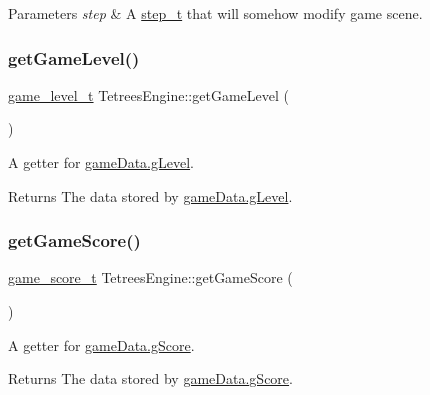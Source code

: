 \begin{DoxyParams}{Parameters}
{\em step} & A \hyperlink{TetreesDefs_8hpp_a4d5a793092a473f85b4c1f7faf62afed}{step\+\_\+t} that will somehow modify game scene. \\
\hline
\end{DoxyParams}
\mbox{\label{classTetreesEngine_a7ad503b48ba753c446e5438ca67aa4e3}} 
\subsubsection{\texorpdfstring{get\+Game\+Level()}{getGameLevel()}}
{\footnotesize\ttfamily \hyperlink{structgame__level__t}{game\+\_\+level\+\_\+t} Tetrees\+Engine\+::get\+Game\+Level (\begin{DoxyParamCaption}{ }\end{DoxyParamCaption})}

A getter for \hyperlink{TetreesDefs_8hpp_aebae08b2e3a36f1452b33acaf1eaab40}{game\+Data.g\+Level}. \begin{DoxyReturn}{Returns}
The data stored by \hyperlink{TetreesDefs_8hpp_aebae08b2e3a36f1452b33acaf1eaab40}{game\+Data.g\+Level}. 
\end{DoxyReturn}
\mbox{\label{classTetreesEngine_a46108b9a7ea4ab8ebd27323f9752e208}} 
\subsubsection{\texorpdfstring{get\+Game\+Score()}{getGameScore()}}
{\footnotesize\ttfamily \hyperlink{structgame__score__t}{game\+\_\+score\+\_\+t} Tetrees\+Engine\+::get\+Game\+Score (\begin{DoxyParamCaption}{ }\end{DoxyParamCaption})}

A getter for \hyperlink{TetreesDefs_8hpp_aebae08b2e3a36f1452b33acaf1eaab40}{game\+Data.g\+Score}. \begin{DoxyReturn}{Returns}
The data stored by \hyperlink{TetreesDefs_8hpp_aebae08b2e3a36f1452b33acaf1eaab40}{game\+Data.g\+Score}. 
\end{DoxyReturn}
\mbox{\label{classTetreesEngine_a36e231a33457f87875f19d308984b0b8}} 
